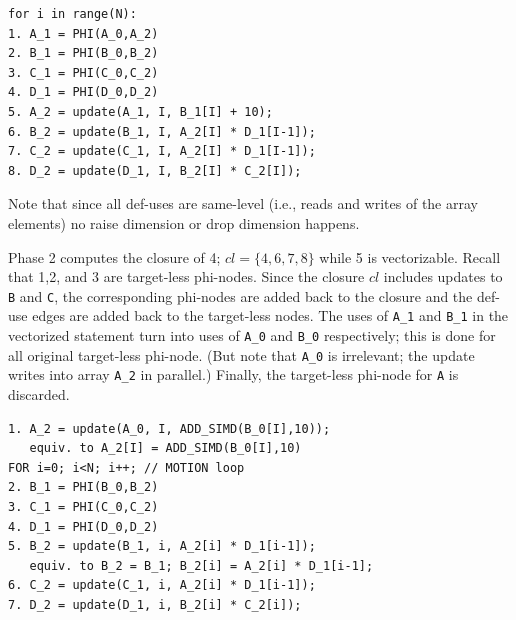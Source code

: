 \documentclass[sigconf, screen, natbib=false, dvipsnames, table]{acmart}
\theoremstyle{definition}
\begin{document}
{\small
\begin{verbatim}
for i in range(N):
1. A_1 = PHI(A_0,A_2)
2. B_1 = PHI(B_0,B_2)
3. C_1 = PHI(C_0,C_2)
4. D_1 = PHI(D_0,D_2)
5. A_2 = update(A_1, I, B_1[I] + 10); 
6. B_2 = update(B_1, I, A_2[I] * D_1[I-1]);
7. C_2 = update(C_1, I, A_2[I] * D_1[I-1]);
8. D_2 = update(D_1, I, B_2[I] * C_2[I]);
\end{verbatim}
}

Note that since all def-uses are same-level (i.e., reads and writes of the array elements) 
no raise dimension or drop dimension happens.

Phase 2 computes the closure of 4; $cl = \{4,6,7, 8\}$ 
while 5 is vectorizable. Recall that 1,2, and 3 are target-less phi-nodes. Since the closure $cl$ includes updates to \texttt{B} and \texttt{C},
the corresponding phi-nodes are added back to the closure and the def-use edges are added back to the target-less nodes. The uses of \texttt{A\_1} and \texttt{B\_1} in the vectorized statement
turn into uses of \texttt{A\_0} and \texttt{B\_0} respectively; this is done for all original target-less phi-node. (But note that \texttt{A\_0} is irrelevant; the update writes into array \texttt{A\_2} in parallel.)
Finally, the target-less phi-node for \texttt{A} is discarded. 

{\small
\begin{verbatim}
1. A_2 = update(A_0, I, ADD_SIMD(B_0[I],10));
   equiv. to A_2[I] = ADD_SIMD(B_0[I],10)
FOR i=0; i<N; i++; // MOTION loop
2. B_1 = PHI(B_0,B_2)
3. C_1 = PHI(C_0,C_2)
4. D_1 = PHI(D_0,D_2)
5. B_2 = update(B_1, i, A_2[i] * D_1[i-1]);
   equiv. to B_2 = B_1; B_2[i] = A_2[i] * D_1[i-1];
6. C_2 = update(C_1, i, A_2[i] * D_1[i-1]);
7. D_2 = update(D_1, i, B_2[i] * C_2[i]);
\end{verbatim}
}
\end{document}
